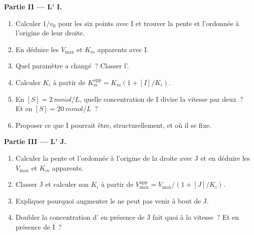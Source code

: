 \begin{problem}
\medskip
\noindent\textbf{Partie II --- L' I.}
\begin{enumerate}[resume]
  \item Calculer $1/v_0$ pour les six points avec I et trouver la pente
        et l'ordonnée à l'origine de leur droite.
  \item En déduire les $V_{\max}$ et $K_m$ apparents avec I.
  \item Quel paramètre a changé~? Classer l'.
  \item Calculer $K_i$ à partir de
        $K_m^{\text{app}} = K_m(1 + [I]/K_i)$.
  \item En $[S] = \qty{2}{mmol/L}$, quelle concentration de I divise la
        vitesse par deux~? Et en $[S] = \qty{20}{mmol/L}$~?
  \item Proposer ce que I pourrait être, structurellement, et où il se
        fixe.
\end{enumerate}

\medskip
\noindent\textbf{Partie III --- L' J.}
\begin{enumerate}[resume]
  \item Calculer la pente et l'ordonnée à l'origine de la droite avec J
        et en déduire les $V_{\max}$ et $K_m$ apparents.
  \item Classer J et calculer son $K_i$ à partir de
        $V_{\max}^{\text{app}} =
        V_{\max}/(1 + [J]/K_i)$.
  \item Expliquer pourquoi augmenter le  ne peut pas venir à
        bout de J.
  \item Doubler la concentration d' en présence de J fait quoi à
        la vitesse~? Et en présence de I~?
\end{enumerate}


\end{problem}
